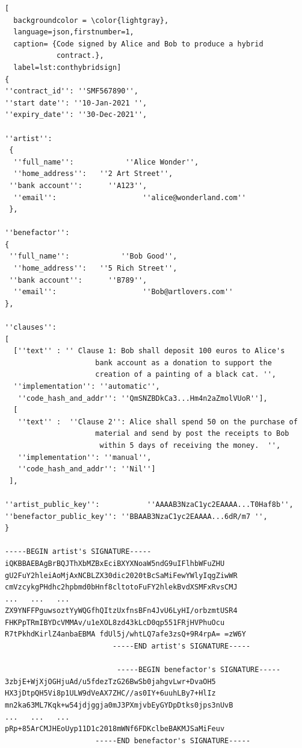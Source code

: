 \documentclass[12pt]{report} %
\begin{document}
\begin{lstlisting}[
  backgroundcolor = \color{lightgray},
  language=json,firstnumber=1,
  caption= {Code signed by Alice and Bob to produce a hybrid 
            contract.},
  label=lst:conthybridsign]
{
''contract_id'': ''SMF567890'',
''start date'': ''10-Jan-2021 '',
''expiry_date'': ''30-Dec-2021'',

''artist'':
 {
  ''full_name'':            ''Alice Wonder'',
  ''home_address'':   ''2 Art Street'',
 ''bank account'':      ''A123'',
  ''email'':                    ''alice@wonderland.com''
 },
 
''benefactor'':
{
 ''full_name'':            ''Bob Good'',
  ''home_address'':   ''5 Rich Street'',
 ''bank account'':      ''B789'',
  ''email'':                    ''Bob@artlovers.com''
},
 
''clauses'':
[
  [''text'' : '' Clause 1: Bob shall deposit 100 euros to Alice's 
                     bank account as a donation to support the 
                     creation of a painting of a black cat. '',
  ''implementation'': ''automatic'',
   ''code_hash_and_addr'': ''QmSNZBDkCa3...Hm4n2aZmolVUoR''],
  [
   ''text'' :  ''Clause 2'': Alice shall spend 50 on the purchase of 
                     material and send by post the receipts to Bob 
                      within 5 days of receiving the money.  '',
   ''implementation'': ''manual'',
   ''code_hash_and_addr'': ''Nil'']
 ],

''artist_public_key'':           ''AAAAB3NzaC1yc2EAAAA...T0Haf8b'',
''benefactor_public_key'': ''BBAAB3NzaC1yc2EAAAA...6dR/m7 '',
}

-----BEGIN artist's SIGNATURE-----
iQKBBAEBAgBrBQJThXbMZBxEciBXYXNoaW5ndG9uIFlhbWFuZHU
gU2FuY2hleiAoMjAxNCBLZX30dic2020tBcSaMiFewYWlyIqgZiwWR
cmVzcykgPHdhc2hpbmd0bHnf8cltotoFuFY2hlekBvdXSMFxRvsCMJ
...   ...   ...
ZX9YNFFPguwsoztYyWQGfhQItzUxfnsBFn4JvU6LyHI/orbzmtUSR4
FHKPpTRmIBYDcVMMAv/u1eXOL8zd43kLcD0qp551FRjHVPhuOcu
R7tPkhdKirlZ4anbaEBMA fdUl5j/whtLQ7afe3zsQ+9R4rpA= =zW6Y
                         -----END artist's SIGNATURE-----

                          -----BEGIN benefactor's SIGNATURE-----
3zbjE+WjXjOGHjuAd/u5fdezTzG26BwSb0jahgvLwr+DvaOH5
HX3jDtpQH5Vi8p1ULW9dVeAX7ZHC//as0IY+6uuhLBy7+HlIz
mn2ka63ML7Kqk+w54jdjggja0mJ3PXmjvbEyGYDpDtks0jps3nUvB
...   ...   ...
pRp+85ArCMJHEoUyp11D1c2018mWNf6FDKclbeBAKMJSaMiFeuv
                     -----END benefactor's SIGNATURE-----
\end{lstlisting}
\end{document}

